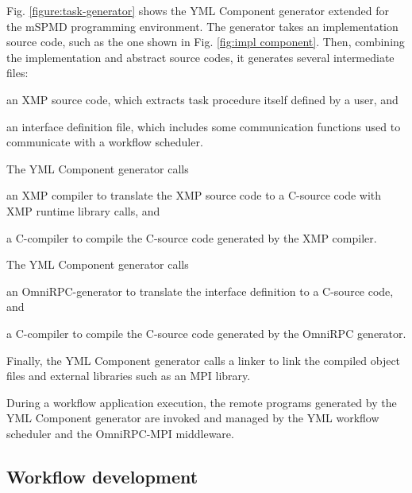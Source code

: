 \documentclass[graybox]{svmult}
\begin{document}
Fig. \ref{figure:task-generator} shows the YML Component generator extended for the mSPMD programming environment. The generator takes an implementation source code, such as the one shown in Fig. \ref{fig:impl component}. Then, combining the implementation and abstract source codes, it generates several intermediate files: 
\begin{enumerate*}
\item an XMP source code, which extracts task procedure itself defined by a user, and
\item an interface definition file, which includes some communication functions used to communicate with a workflow scheduler.
\end{enumerate*}
The YML Component generator calls
\begin{enumerate*}
\item an XMP compiler to translate the XMP source code to a C-source code with XMP runtime library calls, and
\item  a C-compiler to compile the C-source code generated by the XMP compiler.
\end{enumerate*}
The YML Component generator calls
\begin{enumerate*}
\item an OmniRPC-generator to translate the interface definition to a C-source code, and
\item a C-compiler to compile the C-source code generated by the OmniRPC generator.
\end{enumerate*}
Finally, the YML Component generator calls a linker to link the compiled object files and external libraries such as an MPI library.

During a workflow application execution, the remote programs generated by the YML Component generator are invoked and managed by the YML workflow scheduler and the OmniRPC-MPI middleware. 

\subsection{Workflow development}
\label{subsection:workflow-yvettml}
\end{document}

